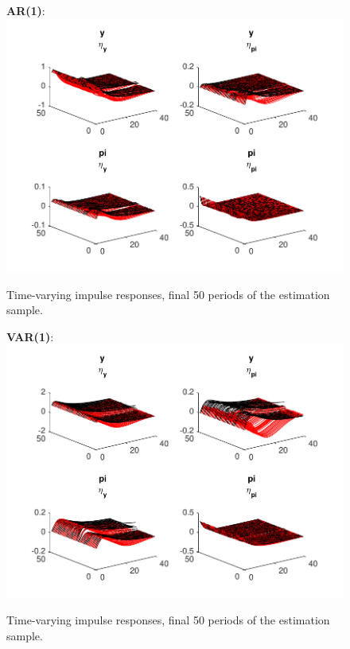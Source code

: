 \documentclass[12pt,reqno]{article}
\numberwithin{equation}{section}
\begin{document}
\newpage

\begin{figure}[H]
\caption{Time-varying impulse responses, final 50 periods of the estimation sample.}

\textbf{AR(1)}: \\
\includegraphics[scale=1]{NKPC_ree_init_AR1_IR_timeVarying.pdf}\\
\end{figure}

\begin{figure}[H]
\caption{Time-varying impulse responses, final 50 periods of the estimation sample.}

\textbf{VAR(1)}: \\
\includegraphics[scale=1]{NKPC_ree_init_VAR_IR_timeVarying.pdf}\\
\end{figure}
\end{document}
